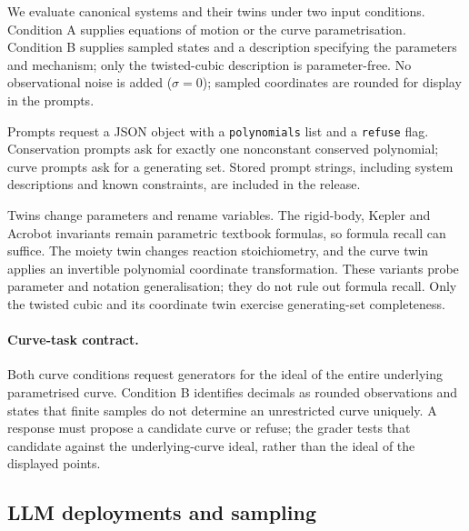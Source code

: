 \documentclass[10pt]{article}
\begin{document}
We evaluate canonical systems and their twins under two input conditions. Condition A supplies equations of motion or the curve parametrisation. Condition B supplies sampled states and a description specifying the parameters and mechanism; only the twisted-cubic description is parameter-free. No observational noise is added ($\sigma=0$); sampled coordinates are rounded for display in the prompts.

Prompts request a JSON object with a \texttt{polynomials} list and a \texttt{refuse} flag. Conservation prompts ask for exactly one nonconstant conserved polynomial; curve prompts ask for a generating set. Stored prompt strings, including system descriptions and known constraints, are included in the release.

Twins change parameters and rename variables. The rigid-body, Kepler and Acrobot invariants remain parametric textbook formulas, so formula recall can suffice. The moiety twin changes reaction stoichiometry, and the curve twin applies an invertible polynomial coordinate transformation. These variants probe parameter and notation generalisation; they do not rule out formula recall. Only the twisted cubic and its coordinate twin exercise generating-set completeness.

\paragraph{Curve-task contract.} Both curve conditions request generators for the ideal of the entire underlying parametrised curve. Condition B identifies decimals as rounded observations and states that finite samples do not determine an unrestricted curve uniquely. A response must propose a candidate curve or refuse; the grader tests that candidate against the underlying-curve ideal, rather than the ideal of the displayed points.

\subsection{LLM deployments and sampling}
\end{document}
